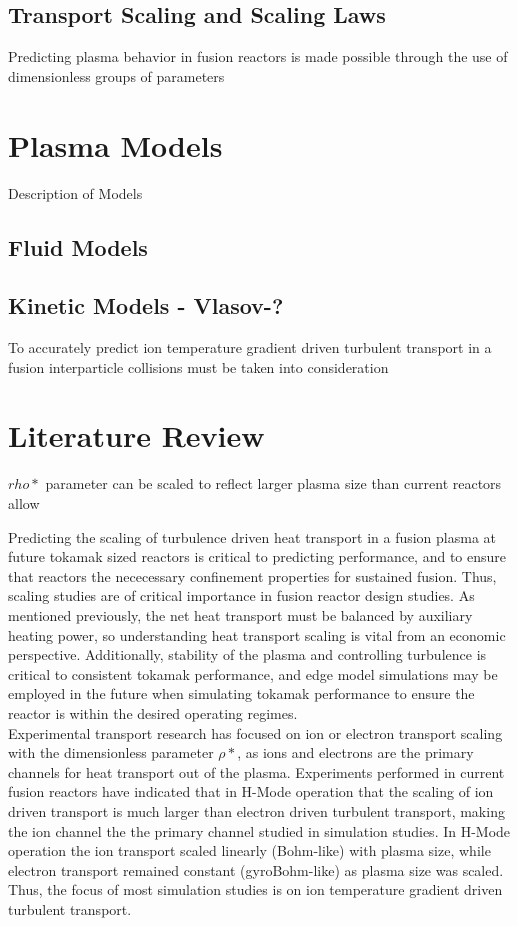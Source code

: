 \documentclass{article}
\begin{document}
\subsection{Transport Scaling and Scaling Laws}
Predicting plasma behavior in fusion reactors is made possible through the use of dimensionless groups of parameters 

\section{Plasma Models}
Description of Models
\subsection{Fluid Models}
\subsection{Kinetic Models - Vlasov-? }
To accurately predict ion temperature gradient driven turbulent transport in a fusion interparticle collisions must be taken into consideration  


\section{Literature Review}
$rho*$ parameter can be scaled to reflect larger plasma size than current reactors allow

Predicting the scaling of turbulence driven heat transport in a fusion plasma at future tokamak sized reactors is critical to predicting performance, and to ensure that reactors the nececessary confinement properties for sustained fusion. Thus, scaling studies are of critical importance in fusion reactor design studies. As mentioned previously, the net heat transport must be balanced by auxiliary heating power, so understanding heat transport scaling is vital from an economic perspective. Additionally, stability of the plasma and controlling turbulence is critical to consistent tokamak performance, and edge model simulations may be employed in the future when simulating tokamak performance to ensure the reactor is within the desired operating regimes. \\

Experimental transport research has focused on ion or electron transport scaling with the dimensionless parameter $\rho*$, as ions and electrons are the primary channels for heat transport out of the plasma. Experiments performed in current fusion reactors have indicated that in H-Mode operation that the scaling of ion driven transport is much larger than electron driven turbulent transport, making the ion channel the the primary channel studied in simulation studies. In H-Mode operation the ion transport scaled linearly (Bohm-like) with plasma size, while electron transport remained constant (gyroBohm-like) as plasma size was scaled. Thus, the focus of most simulation studies is on ion temperature gradient driven turbulent transport. \\
\end{document}
